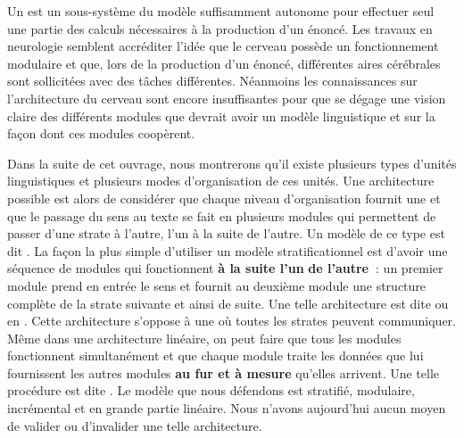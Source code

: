 Un  est un sous-système du modèle suffisamment autonome pour effectuer seul une partie des calculs nécessaires à la production d’un énoncé. Les travaux en neurologie semblent accréditer l’idée que le cerveau possède un fonctionnement modulaire et que, lors de la production d’un énoncé, différentes aires cérébrales sont sollicitées avec des tâches différentes. Néanmoins les connaissances sur l’architecture du cerveau sont encore insuffisantes pour que se dégage une vision claire des différents modules que devrait avoir un modèle linguistique et sur la façon dont ces modules coopèrent.

Dans la suite de cet ouvrage, nous montrerons qu’il existe plusieurs types d’unités linguistiques et plusieurs modes d’organisation de ces unités. Une architecture possible est alors de considérer que chaque niveau d’organisation fournit une  et que le passage du sens au texte se fait en plusieurs modules qui permettent de passer d’une strate à l’autre, l’un à la suite de l’autre. Un modèle de ce type est dit . La façon la plus simple d’utiliser un modèle stratificationnel est d’avoir une séquence de modules qui fonctionnent \textbf{à la suite l’un} \textbf{de l’autre~}: un premier module prend en entrée le sens et fournit au deuxième module une structure complète de la strate suivante et ainsi de suite. Une telle architecture est dite  ou en . Cette architecture s’oppose à une  où toutes les strates peuvent communiquer. Même dans une architecture linéaire, on peut faire que tous les modules fonctionnent simultanément et que chaque module traite les données que lui fournissent les autres modules \textbf{au fur et à mesure} qu’elles arrivent. Une telle procédure est dite . Le modèle que nous défendons est stratifié, modulaire, incrémental et en grande partie linéaire. Nous n’avons aujourd’hui aucun moyen de valider ou d’invalider une telle architecture.

